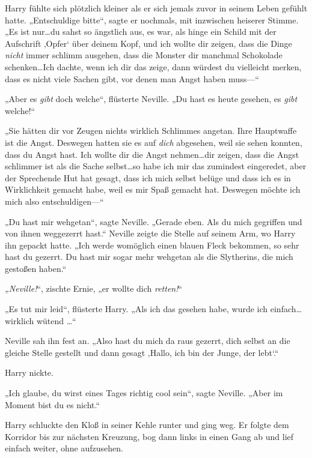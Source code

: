 {Harry fühlte sich plötzlich kleiner als er sich jemals zuvor in seinem Leben gefühlt hatte. „Entschuldige bitte“, sagte er nochmals, mit inzwischen heiserer Stimme. „Es ist nur…du sahst so ängstlich aus, es war, als hinge ein Schild mit der Aufschrift ‚Opfer` über deinem Kopf, und ich wollte dir zeigen, dass die Dinge \emph{nicht} immer schlimm ausgehen, dass die Monster dir manchmal Schokolade schenken…Ich dachte, wenn ich dir das zeige, dann würdest du vielleicht merken, dass es nicht viele Sachen gibt, vor denen man Angst haben muss—“

„Aber es \emph{gibt} doch welche“, flüsterte Neville. „Du hast es heute gesehen, es \emph{gibt} welche!“

„Sie hätten dir vor Zeugen nichts wirklich Schlimmes angetan. Ihre Hauptwaffe ist die Angst. Deswegen hatten sie es auf \emph{dich} abgesehen, weil sie sehen konnten, dass du Angst hast. Ich wollte dir die Angst nehmen…dir zeigen, dass die Angst schlimmer ist als die Sache selbst…so habe ich mir das zumindest eingeredet, aber der Sprechende Hut hat gesagt, dass ich mich selbst belüge und dass ich es in Wirklichkeit gemacht habe, weil es mir Spaß gemacht hat. Deswegen möchte ich mich also entschuldigen—“

„Du hast mir wehgetan“, sagte Neville. „Gerade eben. Als du mich gegriffen und von ihnen weggezerrt hast.“ Neville zeigte die Stelle auf seinem Arm, wo Harry ihn gepackt hatte. „Ich werde womöglich einen blauen Fleck bekommen, so sehr hast du gezerrt. Du hast mir sogar mehr wehgetan als die Slytherins, die mich gestoßen haben.“

\emph{„Neville!}“, zischte Ernie, „er wollte dich \emph{retten!}“

„Es tut mir leid“, flüsterte Harry. „Als ich das gesehen habe, wurde ich einfach…wirklich wütend …“

Neville sah ihn fest an. „Also hast du mich da raus gezerrt, dich selbst an die gleiche Stelle gestellt und dann gesagt ‚Hallo, ich bin der Junge, der lebt`.“

Harry nickte.

„Ich glaube, du wirst eines Tages richtig cool sein“, sagte Neville. „Aber im Moment bist du es nicht.“

Harry schluckte den Kloß in seiner Kehle runter und ging weg. Er folgte dem Korridor bis zur nächsten Kreuzung, bog dann links in einen Gang ab und lief einfach weiter, ohne aufzusehen.

}
